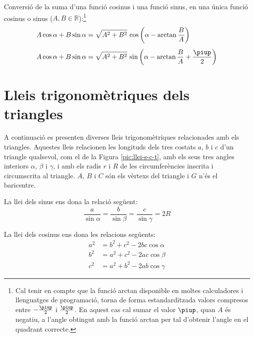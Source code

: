 Conversió de la suma d'una funció cosinus i una funció sinus, en una única
funció cosinus o sinus ($A,B\in\mathbb{R}$):\footnote{Cal tenir en compte que la funció \textsf{arctan} disponible en moltes calculadores i llenguatges de programació, torna de forma estandarditzada valors compresos entre $-\frac{\piup}{2}$ i $\frac{\piup}{2}$. En aquest cas cal sumar el valor $\piup$, quan $A$ és negatiu, a l'angle obtingut amb la funció \textsf{arctan} per tal d'obtenir l'angle en el quadrant correcte.}
\begin{subequations}
\begin{align}
    A \cos \alpha + B \sin \alpha &= \sqrt{A^2+B^2}\, \cos \left(\alpha - \arctan\dfrac{B}{A}\right)\label{eq:AcosBsin}\\[1ex]
    A \cos \alpha + B \sin \alpha &= \sqrt{A^2+B^2}\, \sin \left(\alpha - \arctan\dfrac{B}{A}+\dfrac{\piup}{2}\right)\label{eq:AcosBsinS}
\end{align}
\end{subequations}


\section{Lleis trigonomètriques dels triangles}\label{sec:llei-s-c-t}

A continuació es presenten diverses lleis trigonomètriques relacionades amb els triangles. Aquestes lleis relacionen les longituds dels tres costats $a$, $b$ i $c$ d'un triangle qualsevol, com el de
la Figura \vref{pic:llei-s-c-t}, amb els seus tres angles interiors
$\alpha$, $\beta$ i $\gamma$, i amb els radis $r$ i $R$ de les circumferències inscrita i circumscrita al triangle. $A$, $B$ i $C$ són els vèrtexs del triangle i $G$ n'és el baricentre.

\begin{center}
    
     \label{pic:llei-s-c-t}
\end{center}

La llei dels sinus ens dona la relació següent:
\begin{equation}
    \frac{a}{\sin\alpha} = \frac{b}{\sin\beta} =
    \frac{c}{\sin\gamma} = 2 R
\end{equation}

La llei dels cosinus ens dona les relacions següents:
\begin{subequations}
\begin{align}
    a^2 &= b^2 + c^2 - 2 b c \cos\alpha \\[1ex]
    b^2 &= a^2 + c^2 - 2 a c \cos\beta \\[1ex]
    c^2 &= a^2 + b^2 - 2 a b \cos\gamma
\end{align}
\end{subequations}

